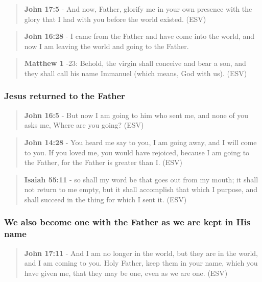 \documentclass[11pt]{article}
\begin{document}
\begin{quote}
\textbf{John 17:5} - And now, Father, glorify me in your own presence with the glory that I had with you before the world existed. (ESV)
\end{quote}

\begin{quote}
\textbf{John 16:28} - I came from the Father and have come into the world, and now I am leaving the world and going to the Father.
\end{quote}

\begin{quote}
\textbf{Matthew 1} -23: Behold, the virgin shall conceive and bear a son, and they shall call his name Immanuel (which means, God with us). (ESV)
\end{quote}

\subsubsection{Jesus returned to the Father}
\label{sec:orgf3f50ab}

\begin{quote}
\textbf{John 16:5} - But now I am going to him who sent me, and none of you asks me, Where are you going? (ESV)
\end{quote}

\begin{quote}
\textbf{John 14:28} - You heard me say to you, I am going away, and I will come to you. If you loved me, you would have rejoiced, because I am going to the Father, for the Father is greater than I. (ESV)
\end{quote}

\begin{quote}
\textbf{Isaiah 55:11} - so shall my word be that goes out from my mouth; it shall not return to me empty, but it shall accomplish that which I purpose, and shall succeed in the thing for which I sent it. (ESV)
\end{quote}

\subsubsection{We also become one with the Father as we are kept in His name}
\label{sec:org4537622}

\begin{quote}
\textbf{John 17:11} - And I am no longer in the world, but they are in the world, and I am coming to you. Holy Father, keep them in your name, which you have given me, that they may be one, even as we are one. (ESV)
\end{quote}
\end{document}
